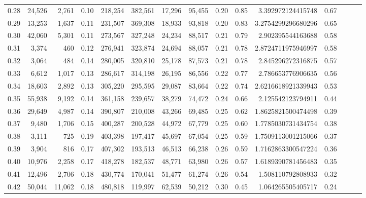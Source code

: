 \begin{tabular}{rrrrrrrrrrrrrrr}
0.28 &  24,526 &   2,761 &  0.10 &  218,254 &  382,561 &   17,296 &   95,455 &  0.20 &  0.85 &       3.392972124415748 &      0.67 \\
0.29 &  13,253 &   1,637 &  0.11 &  231,507 &  369,308 &   18,933 &   93,818 &  0.20 &  0.83 &      3.2754299296680296 &      0.65 \\
0.30 &  42,060 &   5,301 &  0.11 &  273,567 &  327,248 &   24,234 &   88,517 &  0.21 &  0.79 &       2.902395544163688 &      0.58 \\
0.31 &   3,374 &     460 &  0.12 &  276,941 &  323,874 &   24,694 &   88,057 &  0.21 &  0.78 &      2.8724711975946997 &      0.58 \\
0.32 &   3,064 &     484 &  0.14 &  280,005 &  320,810 &   25,178 &   87,573 &  0.21 &  0.78 &       2.845296272316875 &      0.57 \\
0.33 &   6,612 &   1,017 &  0.13 &  286,617 &  314,198 &   26,195 &   86,556 &  0.22 &  0.77 &       2.786653776906635 &      0.56 \\
0.34 &  18,603 &   2,892 &  0.13 &  305,220 &  295,595 &   29,087 &   83,664 &  0.22 &  0.74 &      2.6216618921339943 &      0.53 \\
0.35 &  55,938 &   9,192 &  0.14 &  361,158 &  239,657 &   38,279 &   74,472 &  0.24 &  0.66 &       2.125542123794911 &      0.44 \\
0.36 &  29,649 &   4,987 &  0.14 &  390,807 &  210,008 &   43,266 &   69,485 &  0.25 &  0.62 &      1.8625821500474498 &      0.39 \\
0.37 &   9,480 &   1,706 &  0.15 &  400,287 &  200,528 &   44,972 &   67,779 &  0.25 &  0.60 &      1.7785030731434754 &      0.38 \\
0.38 &   3,111 &     725 &  0.19 &  403,398 &  197,417 &   45,697 &   67,054 &  0.25 &  0.59 &      1.7509113001215066 &      0.37 \\
0.39 &   3,904 &     816 &  0.17 &  407,302 &  193,513 &   46,513 &   66,238 &  0.26 &  0.59 &      1.7162863300547224 &      0.36 \\
0.40 &  10,976 &   2,258 &  0.17 &  418,278 &  182,537 &   48,771 &   63,980 &  0.26 &  0.57 &      1.6189390781456483 &      0.35 \\
0.41 &  12,496 &   2,706 &  0.18 &  430,774 &  170,041 &   51,477 &   61,274 &  0.26 &  0.54 &       1.508110792808933 &      0.32 \\
0.42 &  50,044 &  11,062 &  0.18 &  480,818 &  119,997 &   62,539 &   50,212 &  0.30 &  0.45 &       1.064265505405717 &      0.24 \\

\end{tabular}
